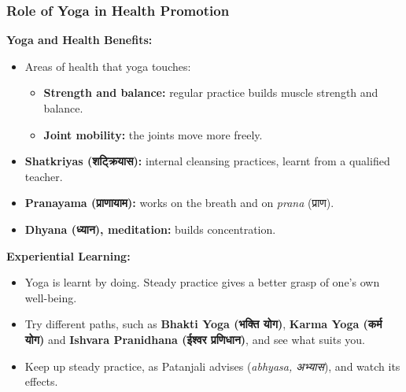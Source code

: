 \begin{frame}[fragile,shrink=6]\frametitle{Role of Yoga in Health Promotion}
    \textbf{Yoga and Health Benefits:}
    \begin{itemize}
        \item Areas of health that yoga touches:
        \begin{itemize}
            \item \textbf{Strength and balance:} regular practice builds muscle strength and balance.
            \item \textbf{Joint mobility:} the joints move more freely.
        \end{itemize}
        \item \textbf{Shatkriyas (शट्क्रियास):} internal cleansing practices, learnt from a qualified teacher.
        \item \textbf{Pranayama (प्राणायाम):} works on the breath and on \textit{prana} (प्राण).
        \item \textbf{Dhyana (ध्यान), meditation:} builds concentration.
    \end{itemize}

    \textbf{Experiential Learning:}
    \begin{itemize}
        \item Yoga is learnt by doing. Steady practice gives a better grasp of one's own well-being.
        \item Try different paths, such as \textbf{Bhakti Yoga (भक्ति योग)}, \textbf{Karma Yoga (कर्म योग)} and \textbf{Ishvara Pranidhana (ईश्वर प्रणिधान)}, and see what suits you.
        \item Keep up steady practice, as Patanjali advises (\textit{abhyasa, अभ्यास}), and watch its effects.
    \end{itemize}
\end{frame}

